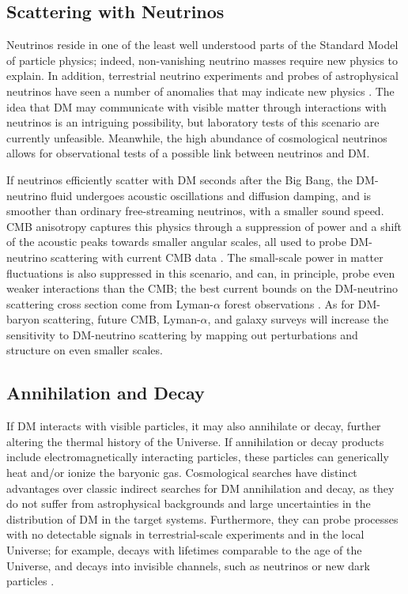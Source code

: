 \documentclass[12pt]{article}
\begin{document}
\vspace{-0.3cm}
\subsection{Scattering with Neutrinos}

Neutrinos reside in one of the least well understood parts of the Standard Model of particle physics; indeed, non-vanishing neutrino masses require new physics to explain. 
In addition, terrestrial neutrino experiments and probes of astrophysical neutrinos have seen a number of anomalies that may indicate new physics \cite{Athanassopoulos:1996jb, Aguilar:2001ty,AguilarArevalo:2007it,2018arXiv180512028M,Gorham:2016zah,Gorham:2018ydl}.
The idea that DM may communicate with visible matter through interactions with neutrinos is an intriguing possibility, but laboratory tests of this scenario are currently unfeasible.
Meanwhile, the high abundance of cosmological neutrinos allows for observational tests of a possible link between neutrinos and DM.

If neutrinos efficiently scatter with DM seconds after the Big Bang, the DM-neutrino fluid undergoes acoustic oscillations and diffusion damping, and is smoother than ordinary free-streaming neutrinos, with a smaller sound speed.
CMB anisotropy captures this physics through a suppression of power and a shift of the acoustic peaks towards smaller angular scales, all used to probe DM-neutrino scattering with current CMB data \cite{Mangano:2006mp,Escudero:2015yka,DiValentino:2017oaw,Diacoumis:2018ezi}.
The small-scale power in matter fluctuations is also suppressed in this scenario, and can, in principle, probe even weaker interactions than the CMB; the best current bounds on the DM-neutrino scattering cross section come from Lyman-$\alpha$ forest observations \cite{Wilkinson:2014ksa}.
As for DM-baryon scattering, future CMB, Lyman-$\alpha$, and galaxy surveys will increase the sensitivity to DM-neutrino scattering by mapping out perturbations and structure on even smaller scales.

\vspace{-0.3cm}
\subsection{Annihilation and Decay}

If DM interacts with visible particles, it may also annihilate or decay, further altering the thermal history of the Universe. 
If annihilation or decay products include electromagnetically interacting particles, these particles can generically heat and/or ionize the baryonic gas.
Cosmological searches have distinct advantages over classic indirect searches for DM annihilation and decay, as they do not suffer from astrophysical backgrounds and large uncertainties in the distribution of DM in the target systems.
Furthermore, they can probe processes with no detectable signals in terrestrial-scale experiments and in the local Universe; for example, decays with lifetimes comparable to the age of the Universe, and decays into invisible channels, such as neutrinos or new dark particles \cite{Poulin:2016nat,Poulin:2016anj}. 
\end{document}
